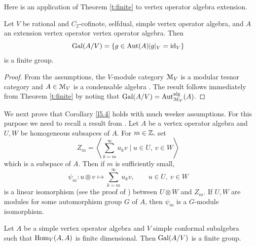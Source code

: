 \documentclass{amsart}
\begin{document}
Here is an application of Theorem \ref{t:finite} to vertex operator algebra extension. 
\begin{cor}\label{l5.4} Let $V$ be rational and $C_2$-cofinote, selfdual, simple vertex operator algebra,  and $A$ an extension vertex operator vertex operator algebra. Then $${\rm Gal}(A/V)=\{g\in{\rm Aut}(A)|g|_{V}=\operatorname{id}_V\}$$ is a finite group.
\end{cor}
\begin{proof} From the assumptions, the $V$-module category ${\EuScript{M}}_V$ is a modular tesnor category \cite{huang2005vertex} and $A\in {\EuScript{M}}_V$ is a condensable algebra \cite{HKL}. The result follows immediately from Theorem \ref{t:finite} by noting that ${\rm Gal}(A/V)={\rm Aut}_{{\EuScript{M}}_V}^{\rm alg}(A)$.
\end{proof}
We next prove that Corollary \ref{l5.4} holds with much weeker assumptions. For this purpose
we need to recall a result from  \cite{DM1998}. Let $A$ be a vertex operator algebra and  $U,W$ be homogeneous subsapces of $A.$ For $m\in\mathbb{Z},$ set
\[
Z_m
=
\left\langle
\sum_{k=m}^{\infty}u_k v
\mid
u\in U,\ v\in W
\right\rangle 
\]
which is a subspace of $A.$
Then if $m$ is sufficiently small,
\[
\psi_m:u\otimes v\mapsto
\sum_{k=m}^{\infty}u_k v,
\qquad
u\in U,\ v\in W
\]
is a linear isomorphism (see the proof of \cite[Prop. 2.1]{DM1998}) between $U\otimes W$ and $Z_m.$ If $U,W$ are modules for some automorphism group $G$ of $A$, then $\psi_m$ is a $G$-module isomorphism.


\begin{prop} Let $A$ be a simple vertex operator algebra and $V$ simple conformal subalgebra  such that $\operatorname{Hom}_V(A,A)$ is finite dimensional.   Then ${\rm Gal}(A/V)$ is a finite group.
    \end{prop}
\end{document}
